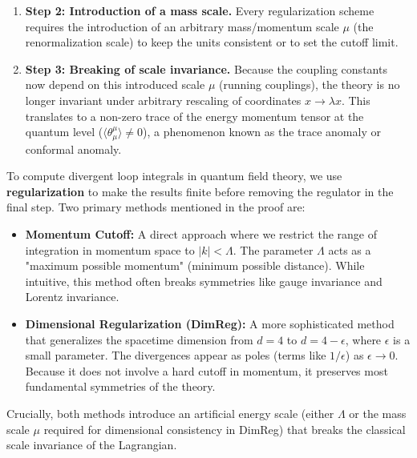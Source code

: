 \begin{solution}
\begin{enumerate}
    \item \textbf{Step 2: Introduction of a mass scale.}
    Every regularization scheme requires the introduction of an arbitrary mass/momentum scale $\mu$ (the renormalization scale) to keep the units consistent or to set the cutoff limit.
    
    \item \textbf{Step 3: Breaking of scale invariance.}
    Because the coupling constants now depend on this introduced scale $\mu$ (running couplings), the theory is no longer invariant under arbitrary rescaling of coordinates $x \to \lambda x$. This translates to a non-zero trace of the energy momentum tensor at the quantum level ($\langle \theta^\mu_\mu \rangle \neq 0$), a phenomenon known as the trace anomaly or conformal anomaly.
\end{enumerate}

\begin{remark}
To compute divergent loop integrals in quantum field theory, we use \textbf{regularization} to make the results finite before removing the regulator in the final step. Two primary methods mentioned in the proof are:
\begin{itemize}
    \item \textbf{Momentum Cutoff:} A direct approach where we restrict the range of integration in momentum space to $|k| < \Lambda$. The parameter $\Lambda$ acts as a "maximum possible momentum" (minimum possible distance). While intuitive, this method often breaks symmetries like gauge invariance and Lorentz invariance.
    \item \textbf{Dimensional Regularization (DimReg):} A more sophisticated method that generalizes the spacetime dimension from $d=4$ to $d = 4 - \epsilon$, where $\epsilon$ is a small parameter. The divergences appear as poles (terms like $1/\epsilon$) as $\epsilon \to 0$. Because it does not involve a hard cutoff in momentum, it preserves most fundamental symmetries of the theory.
\end{itemize}
Crucially, both methods introduce an artificial energy scale (either $\Lambda$ or the mass scale $\mu$ required for dimensional consistency in DimReg) that breaks the classical scale invariance of the Lagrangian.
\end{remark}
\end{solution}

